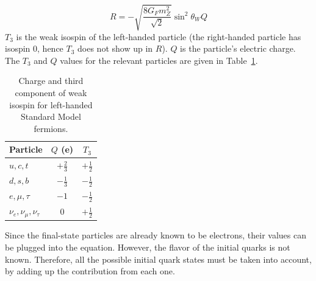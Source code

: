 \[
R = - \sqrt{ \frac{8 G_F m_Z^2}{\sqrt{2} } } \sin^2 \theta_W Q
\]
$T_3$ is the weak isospin of the left-handed particle 
(the right-handed particle has isospin 0, 
hence $T_3$ does not show up in $R$). 
$Q$ is the particle's electric charge.  
The $T_3$ and $Q$ values for the relevant particles are 
given in Table~\ref{TableWeakNumbers}.  

\begin{table}[htbp]
  \begin{center}
    \caption{Charge and third component of weak isospin for 
      left-handed Standard Model fermions.}
    \label{TableWeakNumbers}
    \begin{tabular}[]{ | l | c | c | }
      \hline
      Particle & $Q$ (e) & $T_3$  \\ \hline \hline
      $u,c,t$ & $+\frac{2}{3}$ & $+\frac{1}{2}$ \\ \hline
      $d,s,b$ & $-\frac{1}{3}$ & $-\frac{1}{2}$ \\ \hline
      $e,\mu,\tau$ & $-1$ & $-\frac{1}{2}$ \\ \hline
      $\nu_e, \nu_{\mu}, \nu_{\tau}$ & $0$ & $+\frac{1}{2}$ \\ \hline
    \end{tabular}
  \end{center}
\end{table}




Since the final-state particles are already known to be electrons, 
their values can be plugged into the equation.  
However, the flavor of the initial quarks is not known.  
Therefore, all the possible initial quark states must 
be taken into account, by adding up the contribution from each one.  





